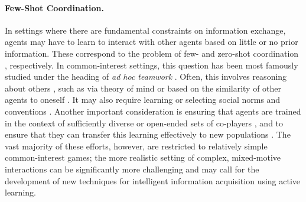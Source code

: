 \paragraph{Few-Shot Coordination.}
In settings where there are fundamental constraints on information exchange, agents may have to learn to interact with other agents based on little or no prior information.
These correspond to the problem of few- \citep{Zhu2021,Fosong2022} and zero-shot coordination \citep{Hu2020,Treutlein2021}, respectively.
In common-interest settings, this question has been most famously studied under the heading of \textit{ad hoc teamwork} \citep[see also ]{Stone2010}.
Often, this involves reasoning about others \citep{Albrecht2018}, such as via theory of mind \citep{Zhu2021,Nguyen2024} or based on the similarity of other agents to oneself \citep{Albert2001,Meyer2016,Bell2021NewcombRL,Barasz2014,oesterheld2024similarity}.
It may also require learning or selecting social norms and conventions \citep{lerer2019,Tucker2020}.
Another important consideration is ensuring that agents are trained in the context of sufficiently diverse or open-ended sets of co-players \citep{Lupu2021,Li2023a}, and to ensure that they can transfer this learning effectively to new populations \citep[see also ]{Wang2021a,Leibo2021-cf,Agapiou2022-an}.
The vast majority of these efforts, however, are restricted to relatively simple common-interest games; the more realistic setting of complex, mixed-motive interactions can be significantly more challenging and may call for the development of new techniques for intelligent information acquisition using active learning.

